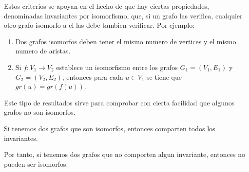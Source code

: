 Estos criterios se apoyan en el hecho de que hay ciertas propiedades, denominadas invariantes por isomorfismo, que, si un grafo las verifica, cualquier otro grafo isomorfo a el las debe tambien verificar. Por ejemplo: 
\begin{enumerate}
	\item Dos grafos isomorfos deben tener el mismo numero de vertices y el mismo numero de aristas.
	\item Si \(f \colon V_1 \to V_2 \) establece un isomorfismo entre los grafos \(G_1 = (V_1, E_1 )\) y \(G_2 = (V_2, E_2 )\), entonces para cada \(u \in V_1 \) se tiene que \(gr(u) = gr(f(u ))\).
\end{enumerate}
Este tipo de resultados sirve para comprobar con cierta facilidad que algunos grafos no son isomorfos. 

\begin{theorem}
	Si tenemos dos grafos que son isomorfos, entonces comparten todos los invariantes. 
	
	Por tanto, si tenemos dos grafos que no comporten algun invariante, entonces no pueden ser isomorfos. 
\end{theorem}
